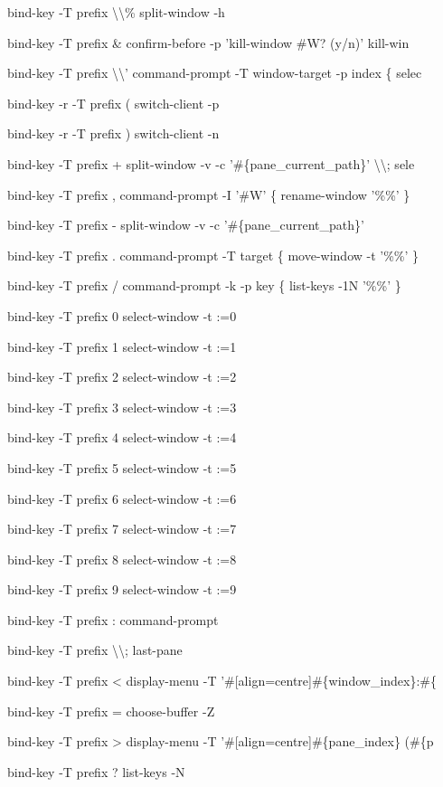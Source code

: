 \documentclass[11pt,a4paper,twoside]{book}
\begin{document}
bind-key  -T prefix  \textbackslash{}\textbackslash{}\%  split-window -h

bind-key  -T prefix  \&  confirm-before -p 'kill-window \#W? (y/n)' kill-win

bind-key  -T prefix  \textbackslash{}\textbackslash{}'  command-prompt -T window-target -p index \{ selec

bind-key -r -T prefix  (  switch-client -p

bind-key -r -T prefix  )  switch-client -n

bind-key  -T prefix  +  split-window -v -c '\#\{pane\_current\_path\}' \textbackslash{}\textbackslash{}; sele

bind-key  -T prefix  ,  command-prompt -I '\#W' \{ rename-window '\%\%' \}

bind-key  -T prefix  -  split-window -v -c '\#\{pane\_current\_path\}'

bind-key  -T prefix  .  command-prompt -T target \{ move-window -t '\%\%' \}

bind-key  -T prefix  /  command-prompt -k -p key \{ list-keys -1N '\%\%' \}

bind-key  -T prefix  0  select-window -t :=0

bind-key  -T prefix  1  select-window -t :=1

bind-key  -T prefix  2  select-window -t :=2

bind-key  -T prefix  3  select-window -t :=3

bind-key  -T prefix  4  select-window -t :=4

bind-key  -T prefix  5  select-window -t :=5

bind-key  -T prefix  6  select-window -t :=6

bind-key  -T prefix  7  select-window -t :=7

bind-key  -T prefix  8  select-window -t :=8

bind-key  -T prefix  9  select-window -t :=9

bind-key  -T prefix  :  command-prompt

bind-key  -T prefix  \textbackslash{}\textbackslash{};  last-pane

bind-key  -T prefix  <  display-menu -T '\#[align=centre]\#\{window\_index\}:\#\{

bind-key  -T prefix  =  choose-buffer -Z

bind-key  -T prefix  >  display-menu -T '\#[align=centre]\#\{pane\_index\} (\#\{p

bind-key  -T prefix  ?  list-keys -N
\end{document}
